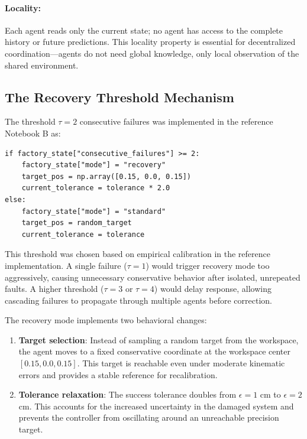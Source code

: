 ﻿\documentclass[12pt,a4paper,oneside]{report}
\begin{document}
\paragraph{Locality:} Each agent reads only the current state; no agent has access to the complete history or future predictions. This locality property is essential for decentralized coordination---agents do not need global knowledge, only local observation of the shared environment.

\subsection{The Recovery Threshold Mechanism}

The threshold $\tau = 2$ consecutive failures was implemented in the reference Notebook B as:

\begin{verbatim}
if factory_state["consecutive_failures"] >= 2:
    factory_state["mode"] = "recovery"
    target_pos = np.array([0.15, 0.0, 0.15])
    current_tolerance = tolerance * 2.0
else:
    factory_state["mode"] = "standard"
    target_pos = random_target
    current_tolerance = tolerance
\end{verbatim}

This threshold was chosen based on empirical calibration in the reference implementation. A single failure ($\tau = 1$) would trigger recovery mode too aggressively, causing unnecessary conservative behavior after isolated, unrepeated faults. A higher threshold ($\tau = 3$ or $\tau = 4$) would delay response, allowing cascading failures to propagate through multiple agents before correction.

The recovery mode implements two behavioral changes:

\begin{enumerate}
    \item \textbf{Target selection}: Instead of sampling a random target from the workspace, the agent moves to a fixed conservative coordinate at the workspace center $[0.15, 0.0, 0.15]$. This target is reachable even under moderate kinematic errors and provides a stable reference for recalibration.
    \item \textbf{Tolerance relaxation}: The success tolerance doubles from $\epsilon = 1$ cm to $\epsilon = 2$ cm. This accounts for the increased uncertainty in the damaged system and prevents the controller from oscillating around an unreachable precision target.
\end{enumerate}
\end{document}
